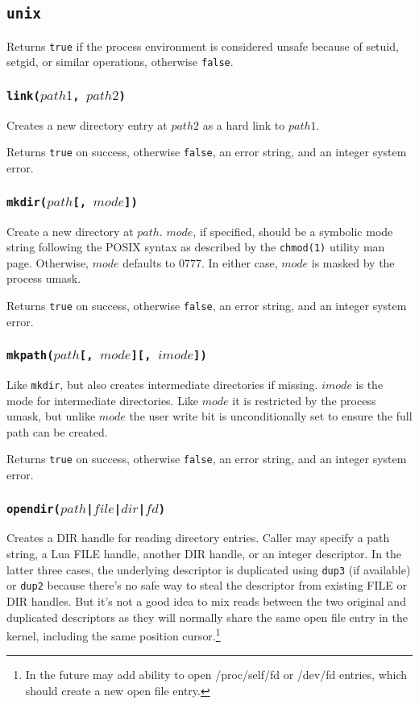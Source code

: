 \documentclass[11pt, oneside]{memoir}
\newcommand*{\true}[0]{\texttt{true}\xspace}
\newcommand*{\false}[0]{\texttt{false}\xspace}
\newcommand*{\syscall}[1]{\texttt{#1}\xspace}
\newcommand*{\fn}[1]{\texttt{#1}\xspace}
\newcounter{toccols}
\newenvironment{Module}[1]{
	\subsection{\texttt{#1}}
	\addtocontents{toc}{
		\protect\begin{multicols}{\value{toccols}}
	}
}{
	\addtocontents{toc}{\protect\end{multicols}}
}
\begin{document}
\begin{Module}{unix}
Returns \true if the process environment is considered unsafe because of setuid, setgid, or similar operations, otherwise \false.

\subsubsection[\fn{link}]{\fn{link($path1$, $path2$)}}

Creates a new directory entry at $path2$ as a hard link to $path1$.

Returns \true on success, otherwise \false, an error string, and an integer system error. 

\subsubsection[\fn{mkdir}]{\fn{mkdir($path$[, $mode$])}}

Create a new directory at $path$. $mode$, if specified, should be a symbolic mode string following the POSIX syntax as described by the \texttt{chmod(1)} utility man page. Otherwise, $mode$ defaults to 0777. In either case, $mode$ is masked by the process umask.

Returns \true on success, otherwise \false, an error string, and an integer system error.

\subsubsection[\fn{mkpath}]{\fn{mkpath($path$[, $mode$][, $imode$])}}

Like \fn{mkdir}, but also creates intermediate directories if missing. $imode$ is the mode for intermediate directories. Like $mode$ it is restricted by the process umask, but unlike $mode$ the user write bit is unconditionally set to ensure the full path can be created.

Returns \true on success, otherwise \false, an error string, and an integer system error.

\subsubsection[\fn{opendir}]{\fn{opendir($path$|$file$|$dir$|$fd$)}}

Creates a DIR handle for reading directory entries. Caller may specify a path string, a Lua FILE handle, another DIR handle, or an integer descriptor. In the latter three cases, the underlying descriptor is duplicated using \syscall{dup3} (if available) or \syscall{dup2} because there's no safe way to steal the descriptor from existing FILE or DIR handles. But it's not a good idea to mix reads between the two original and duplicated descriptors as they will normally share the same open file entry in the kernel, including the same position cursor.\footnote{In the future may add ability to open /proc/self/fd or /dev/fd entries, which should create a new open file entry.}


\end{Module}
\end{document}
